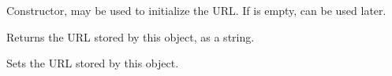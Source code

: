 
Constructor, may be used to initialize the URL. If  is empty, 
 can be used later.


\label{wxurldataobjectgeturl}


Returns the URL stored by this object, as a string.


\label{wxurldataobjectseturl}


Sets the URL stored by this object.

